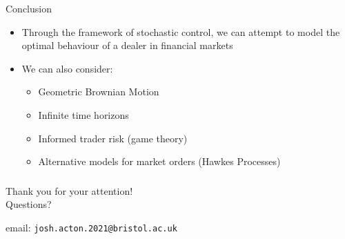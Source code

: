 \documentclass{beamer} %
\begin{document}
\begin{frame}{Conclusion}
    \begin{itemize}
        \item Through the framework of stochastic control, we can attempt to model the optimal behaviour of a dealer in financial markets
        \item We can also consider: 
        \begin{itemize}
            \item Geometric Brownian Motion
            \item Infinite time horizons
            \item Informed trader risk (game theory)
            \item Alternative models for market orders (Hawkes Processes)
        \end{itemize}
    \end{itemize}
\end{frame}

\begin{frame}
    \frametitle{}
    \begin{center}
        \large{Thank you for your attention!}\\
        \vspace{1cm}
        Questions?
        \vspace{2cm}

        email: \texttt{josh.acton.2021@bristol.ac.uk}
    \end{center}
\end{frame}
\end{document}
